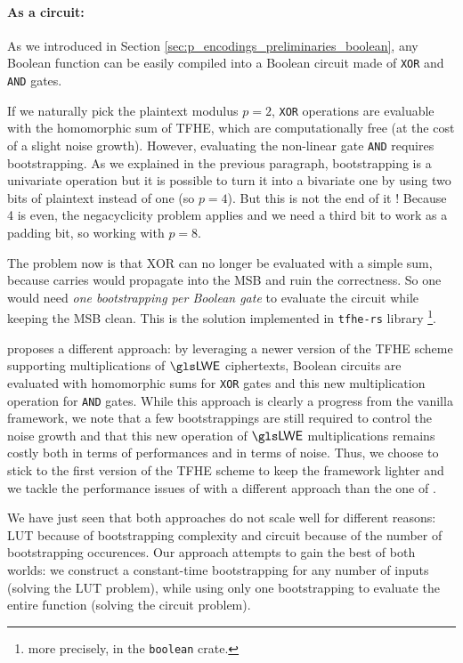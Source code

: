 \paragraph{As a circuit:}

As we introduced in Section \ref{sec:p_encodings_preliminaries_boolean}, any Boolean function can be easily compiled into a Boolean circuit made of \texttt{XOR} and \texttt{AND} gates. 

If we naturally pick the plaintext modulus $p=2$, \texttt{XOR} operations are evaluable with the homomorphic sum of \gls{TFHE}, which are computationally free (at the cost of a slight noise growth). However, evaluating the non-linear gate \texttt{AND} requires bootstrapping. As we explained in the previous paragraph, bootstrapping is a univariate operation but it is possible to turn it into a bivariate one by using two bits of plaintext instead of one (so $p=4$). But this is not the end of it ! Because 4 is even, the negacyclicity problem applies and we need a third bit to work as a padding bit, so working with $p=8$.

The problem now is that XOR can no longer be evaluated with a simple sum, because carries would propagate into the \gls{MSB} and ruin the correctness. So one would need \textit{one bootstrapping per Boolean gate} to evaluate the circuit while keeping the \gls{MSB} clean. This is the solution implemented in \texttt{tfhe-rs} library \cite{tfhe-rs}\footnote{more precisely, in the \texttt{boolean} crate.}. 


\cite{AC:CLOT21} proposes a different approach: by leveraging a newer version of the \gls{TFHE} scheme supporting multiplications of $\LWE$ ciphertexts, Boolean circuits are evaluated with homomorphic sums for \texttt{XOR} gates and this new multiplication operation for \texttt{AND} gates. While this approach is clearly a progress from the vanilla framework, we note that a few bootstrappings are still required to control the noise growth and that this new operation of $\LWE$ multiplications remains costly both in terms of performances and in terms of noise. Thus, we choose to stick to the first version of the \gls{TFHE} scheme to keep the framework lighter and we tackle the performance issues of \cite{JC:CGGI20} with a different approach than the one of \cite{AC:CLOT21}.

\bigskip

We have just seen that both approaches do not scale well for different reasons: \gls{LUT} because of bootstrapping complexity and circuit because of the number of bootstrapping occurences. Our approach attempts to gain the best of both worlds: we construct a constant-time bootstrapping for any number of inputs (solving the \gls{LUT} problem), while using only one bootstrapping to evaluate the entire function (solving the circuit problem).

